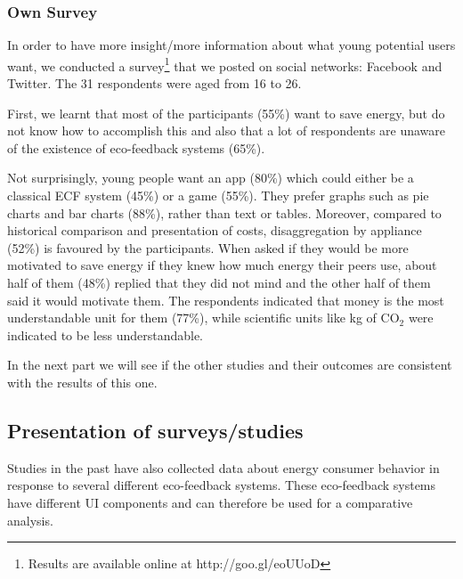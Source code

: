 \documentclass[journal]{vgtc}                %
\begin{document}
\subsubsection{Own Survey}

In order to have more insight/more information about what young potential users want, we conducted a survey\footnote{Results are available online at {http://goo.gl/eoUUoD}} that we posted on social networks: Facebook and Twitter.
The 31 respondents were aged from 16 to 26.%

First, we learnt that most of the participants (55\%) want to save energy, but do not know how to accomplish this and also that a lot of respondents are unaware of the existence of eco-feedback systems (65\%).
 
Not surprisingly, young people want an app (80\%) which could either be a classical ECF system (45\%) or a game (55\%).
They prefer graphs such as pie charts and bar charts (88\%), rather than text or tables. 
Moreover, compared to historical comparison and presentation of costs, disaggregation by appliance (52\%) is favoured by the participants.
When asked if they would be more motivated to save energy if they knew how much energy their peers use, about half of them (48\%) replied that they did not mind and the other half of them said it would motivate them.
The respondents indicated that money is the most understandable unit for them (77\%), while scientific units like kg of CO$_2$ were indicated to be less understandable.

In the next part we will see if the other studies and their outcomes are consistent with the results of this one.



\subsection{Presentation of surveys/studies} %
Studies in the past have also collected data about energy consumer behavior in response to several different eco-feedback systems. These eco-feedback systems have different UI components and can therefore be used for a comparative analysis.
\end{document}
